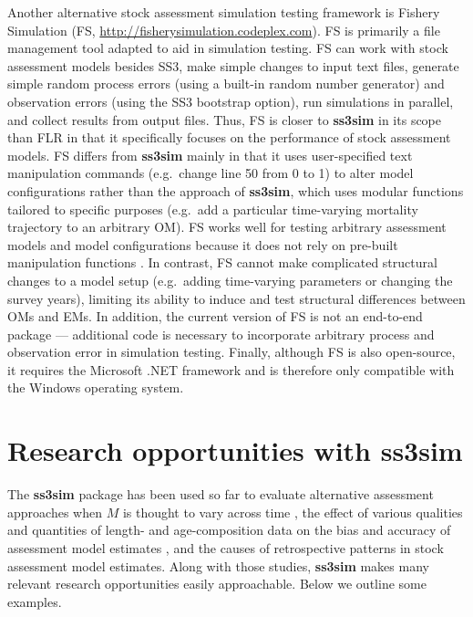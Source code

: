 \documentclass[11pt]{article}
\begin{document}
\begin{spacing}{1.2}
Another alternative stock assessment simulation testing framework is Fishery
Simulation (FS, \url{http://fisherysimulation.codeplex.com}). FS is primarily a
file management tool adapted to aid in simulation testing. FS can work with
stock assessment models besides SS3, make simple changes to input text files,
generate simple random process errors (using a built-in random number
generator) and observation errors (using the SS3 bootstrap option), run
simulations in parallel, and collect results from output files. Thus, FS is
closer to \textbf{ss3sim} in its scope than FLR in that it specifically focuses
on the performance of stock assessment models. FS differs from \textbf{ss3sim}
mainly in that it uses user-specified text manipulation commands (e.g.~change
line 50 from 0 to 1) to alter model configurations rather than the approach of
\textbf{ss3sim}, which uses modular functions tailored to specific purposes
(e.g.~add a particular time-varying mortality trajectory to an arbitrary OM).
FS works well for testing arbitrary assessment models and model configurations
because it does not rely on pre-built manipulation functions \cite{lee2012,
  piner2011, lee2011}. In contrast, FS cannot make complicated structural
changes to a model setup (e.g.~adding time-varying parameters or changing the
survey years), limiting its ability to induce and test structural differences
between OMs and EMs. In addition, the current version of FS is not an
end-to-end package --- additional code is necessary to incorporate arbitrary
process and observation error in simulation testing. Finally, although FS is
also open-source, it requires the Microsoft .NET framework and is therefore
only compatible with the Windows operating system.

\section*{Research opportunities with ss3sim}

The \textbf{ss3sim} package has been used so far to evaluate alternative
assessment approaches when $M$ is thought to vary across time
\cite{johnson2014}, the effect of various qualities and quantities of
length- and age-composition data on the bias and accuracy of assessment model
estimates \cite{ono2014}, and the causes of retrospective patterns in stock
assessment model estimates. Along with those studies, \textbf{ss3sim} makes
many relevant research opportunities easily approachable. Below we outline some
examples.


\end{spacing}
\end{document}

